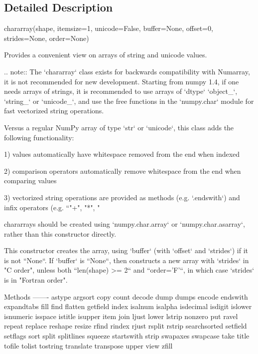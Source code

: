 \subsection{Detailed Description}
\begin{DoxyVerb}chararray(shape, itemsize=1, unicode=False, buffer=None, offset=0,
          strides=None, order=None)

Provides a convenient view on arrays of string and unicode values.

.. note::
   The `chararray` class exists for backwards compatibility with
   Numarray, it is not recommended for new development. Starting from numpy
   1.4, if one needs arrays of strings, it is recommended to use arrays of
   `dtype` `object_`, `string_` or `unicode_`, and use the free functions
   in the `numpy.char` module for fast vectorized string operations.

Versus a regular NumPy array of type `str` or `unicode`, this
class adds the following functionality:

  1) values automatically have whitespace removed from the end
     when indexed

  2) comparison operators automatically remove whitespace from the
     end when comparing values

  3) vectorized string operations are provided as methods
     (e.g. `.endswith`) and infix operators (e.g. ``"+", "*", "%

chararrays should be created using `numpy.char.array` or
`numpy.char.asarray`, rather than this constructor directly.

This constructor creates the array, using `buffer` (with `offset`
and `strides`) if it is not ``None``. If `buffer` is ``None``, then
constructs a new array with `strides` in "C order", unless both
``len(shape) >= 2`` and ``order='F'``, in which case `strides`
is in "Fortran order".

Methods
-------
astype
argsort
copy
count
decode
dump
dumps
encode
endswith
expandtabs
fill
find
flatten
getfield
index
isalnum
isalpha
isdecimal
isdigit
islower
isnumeric
isspace
istitle
isupper
item
join
ljust
lower
lstrip
nonzero
put
ravel
repeat
replace
reshape
resize
rfind
rindex
rjust
rsplit
rstrip
searchsorted
setfield
setflags
sort
split
splitlines
squeeze
startswith
strip
swapaxes
swapcase
take
title
tofile
tolist
tostring
translate
transpose
upper
view
zfill


\end{DoxyVerb}
